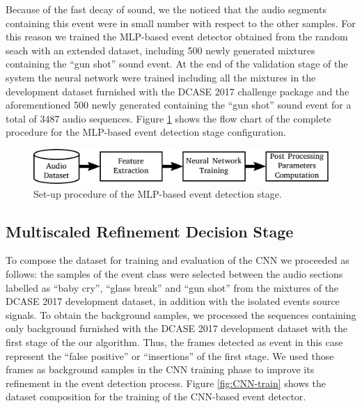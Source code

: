 \documentclass{article}
\begin{document}
\begin{sloppy}
Because of the fast decay of  sound, we the noticed that the audio segments containing this event were in small number with respect to the other samples. For this reason we trained the MLP-based event detector obtained from the random seach with an extended dataset, including 500 newly generated mixtures containing the ``gun shot'' sound event.
At the end of the validation stage of the system the neural network were trained including all the mixtures in the development dataset furnished with the DCASE 2017 challenge package and the aforementioned 500 newly generated containing the ``gun shot'' sound event for a total of 3487 audio sequences. Figure \ref{fig:MLP-train} shows the flow chart of the complete procedure for the MLP-based event detection stage configuration.

\begin{figure}[t]
	\centering
	\includegraphics[width=\columnwidth]{Images/training_first_stage.pdf}
	\caption{Set-up procedure of the MLP-based event detection stage.}
	\label{fig:MLP-train}
\end{figure}

\subsection{Multiscaled Refinement Decision Stage}

%

To compose the dataset for training and evaluation of the CNN we proceeded as follows: the samples of the event class were selected between the audio sections labelled as ``baby cry'', ``glass break'' and ``gun shot'' from the mixtures of the DCASE 2017 development dataset, in addition with the isolated events source signals. To obtain the background samples, we processed the sequences containing only background furnished with the DCASE 2017 development dataset with the first stage of the our algorithm. Thus, the frames detected as event in this case represent the ``false positive'' or ``insertions'' of the first stage. We used those frames as background samples in the CNN training phase to improve its refinement in the event detection process. Figure \ref{fig:CNN-train} shows the dataset composition for the training of the CNN-based event detector.


\end{sloppy}
\end{document}
